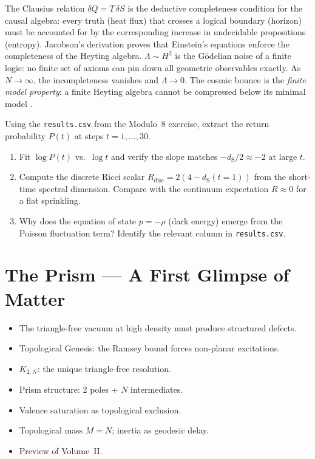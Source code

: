 \documentclass[11pt, a4paper, openany]{book}
\newcommand{\dS}{d_{\mathrm{S}}}
\newenvironment{introduction}[1][Modulo Overview]{%
  \begin{tcolorbox}[
    enhanced,colback=structure!5,colframe=structure,
    colbacktitle=structure,coltitle=white,
    fonttitle=\small\bfseries,title={#1},
    arc=2pt,boxrule=0.7pt,
    left=8pt,right=8pt,top=6pt,bottom=6pt,
    before skip=12pt,after skip=12pt
  ]\itshape\begin{itemize}[leftmargin=*,itemsep=2pt,parsep=0pt]
}{%
  \end{itemize}\end{tcolorbox}
}
\begin{document}
\begin{logicalreading}
The Clausius relation $\delta Q = T\,\delta S$ is the deductive
completeness condition for the causal algebra: every truth (heat flux)
that crosses a logical boundary (horizon) must be accounted for by the
corresponding increase in undecidable propositions (entropy). Jacobson's
derivation proves that Einstein's equations enforce the completeness of
the Heyting algebra. $\Lambda \sim H^2$ is the G\"odelian noise of a
finite logic: no finite set of axioms can pin down all geometric
observables exactly. As $N \to \infty$, the incompleteness vanishes and
$\Lambda \to 0$. The cosmic bounce is the \emph{finite model property}:
a finite Heyting algebra cannot be compressed below its minimal model
\cite{stone1936,ahmed2004}.
\end{logicalreading}


\begin{simulation}
Using the \texttt{results.csv} from the Modulo~8 exercise, extract the return probability $P(t)$ at steps $t = 1, \ldots, 30$.
\begin{enumerate}
\item Fit $\log P(t)$ vs.\ $\log t$ and verify the slope matches $-\dS/2 \approx -2$ at large $t$.
\item Compute the discrete Ricci scalar $R_{\mathrm{disc}} = 2(4 - \dS(t{=}1))$ from the short-time spectral dimension. Compare with the continuum expectation $R \approx 0$ for a flat sprinkling.
\item Why does the equation of state $p = -\rho$ (dark energy) emerge from the Poisson fluctuation term? Identify the relevant column in \texttt{results.csv}.
\end{enumerate}
\end{simulation}


\chapter{The Prism --- A First Glimpse of Matter}\label{ch:prism}

\begin{introduction}
  \item The triangle-free vacuum at high density must produce structured
    defects.
  \item Topological Genesis: the Ramsey bound forces non-planar excitations.
  \item $K_{2,N}$: the unique triangle-free resolution.
  \item Prism structure: 2 poles + $N$ intermediates.
  \item Valence saturation as topological exclusion.
  \item Topological mass $M = N$; inertia as geodesic delay.
  \item Preview of Volume~II.
\end{introduction}
\end{document}
